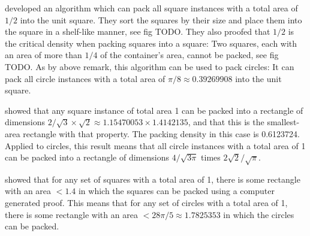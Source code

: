 \textcite{MM1967some} developed an algorithm which can pack all square instances with a total area of $1/2$ into the unit square.
They sort the squares by their size and place them into the square in a shelf-like manner, see fig TODO.
They also proofed that $1/2$ is the critical density when packing squares into a square: Two squares, each with an area of more than $1/4$ of the container's area, cannot be packed, see fig TODO.
As by above remark, this algorithm can be used to pack circles: It can pack all circle instances with a total area of $\pi/8 \approx 0.39269908$ into the unit square.

\textcite{KK1975optimal} showed that any square instance of total area 1 can be packed into a rectangle of dimensions $2/\sqrt{3} \times \sqrt{2} \approx 1.15470053 \times 1.4142135$, and that this is the smallest-area rectangle with that property. The packing density in this case is 0.6123724. Applied to circles, this result means that all circle instances with a total area of 1 can be packed into a rectangle of dimensions $4/\sqrt{3\pi}$ times $2\sqrt{2}/\sqrt{\pi}$.

\textcite{hougardy2011packing} showed that for any set of squares with a total area of 1, there is some rectangle with an area $< 1.4$ in which the squares can be packed using a computer generated proof. This means that for any set of circles with a total area of 1, there is some rectangle with an area $< 28\pi/5 \approx 1.7825353$ in which the circles can be packed.

